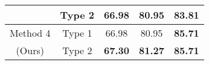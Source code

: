 \begin{table*}[h]
\begin{tabular}{|c|c|c|c|c|}
		                                                          & Type 2                & 66.98                          & 80.95                         & 83.81                          \\
		\hline
		Method 4
		                                                          & Type 1                & 66.98                          & 80.95                         & \textbf{85.71}                 \\
		(Ours)                                                    & Type 2                & \textbf{67.30}                 & \textbf{81.27}                & \textbf{85.71}                 \\


		\hline
	\end{tabular}
	\label{table-1}
\end{table*}


